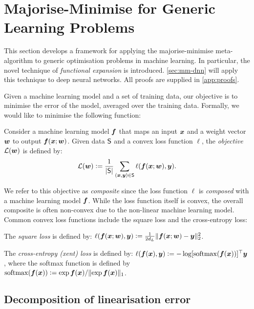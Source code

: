 \section{Majorise-Minimise for Generic Learning Problems}
\label{sec:mm-ml}



This section develops a framework for applying the majorise-minimise meta-algorithm to generic optimisation problems in machine learning. In particular, the novel technique of \textit{functional expansion} is introduced. \cref{sec:mm-dnn} will apply this technique to deep neural networks. All proofs are supplied in \cref{app:proofs}.

Given a machine learning model and a set of training data, our objective is to minimise the error of the model, averaged over the training data. Formally, we would like to minimise the following function:

\begin{definition} Consider a machine learning model ${\bm{f}}$ that maps an input ${\bm{x}}$ and a weight vector ${\bm{w}}$ to output ${\bm{f}}({\bm{x}};{\bm{w}})$. Given data $\mathsf{S}$ and a convex loss function $\ell$, the \textit{objective} $\mathcal{L}({\bm{w}})$ is defined by:
\begin{equation*}
    \mathcal{L}({\bm{w}}) \vcentcolon= \frac{1}{|\mathsf{S}|}\sum_{({\bm{x}},{\bm{y}}) \in \mathsf{S}} \ell({\bm{f}}({\bm{x}};{\bm{w}}), {\bm{y}}).
\end{equation*}
\end{definition}
We refer to this objective as \textit{composite} since the loss function $\ell$ is \textit{composed} with a machine learning model ${\bm{f}}$. While the loss function itself is convex, the overall composite is often non-convex due to the non-linear machine learning model. Common convex loss functions include the square loss and the cross-entropy loss:

\begin{example}\label{ex:sq-loss} The \textit{square loss} is defined by: $\ell({\bm{f}}({\bm{x}}; {\bm{w}}), {\bm{y}}) \vcentcolon= \frac{1}{2d_L} \Vert {{\bm{f}}({\bm{x}}; {\bm{w}}) - {\bm{y}}} \Vert_2^2$.
\end{example}
\begin{example}\label{ex:xent-loss} The \textit{cross-entropy (xent) loss} is defined by: $\ell({\bm{f}}({\bm{x}}), {\bm{y}}) \vcentcolon= - \log [\operatorname{softmax}({\bm{f}}({\bm{x}}))]^\top {\bm{y}}$, where the softmax function is defined by $\operatorname{softmax}({\bm{f}}({\bm{x}}))\vcentcolon= \exp {\bm{f}}({\bm{x}}) / \Vert {\exp {\bm{f}}({\bm{x}})} \Vert_1$.
\end{example}

\subsection{Decomposition of linearisation error}

